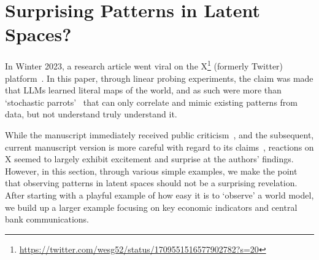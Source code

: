 \documentclass{article}
\theoremstyle{plain}
\theoremstyle{definition}
\theoremstyle{remark}
\begin{document}



\section{Surprising Patterns in Latent Spaces?}\label{patterns-in-latent-spaces-and-how-to-find-them}

In Winter 2023, a research article went viral on the X\footnote{\url{https://twitter.com/wesg52/status/1709551516577902782?s=20}} (formerly Twitter) platform~\cite{gurnee2023languagev1}. In this paper, through linear probing experiments, the claim was made that LLMs learned literal maps of the world, and as such were more than `stochastic parrots'~\cite{bender2021dangers} that can only correlate and mimic existing patterns from data, but not understand truly understand it.

While the manuscript immediately received public criticism~\cite{marcus2023muddles}, and the subsequent, current manuscript version is more careful with regard to its claims~\cite{gurnee2023languagev2}, reactions on X seemed to largely exhibit excitement and surprise at the authors' findings. However, in this section, through various simple examples, we make the point that observing patterns in latent spaces should not be a surprising revelation. After starting with a playful example of how easy it is to `observe' a world model, we build up a larger example focusing on key economic indicators and central bank communications.
\end{document}
